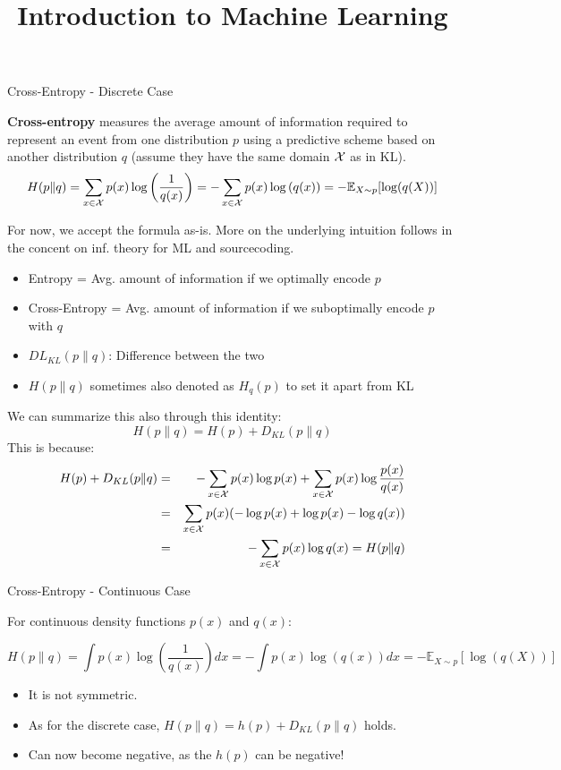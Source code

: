 \documentclass[11pt,compress,t,notes=noshow, xcolor=table]{beamer}
\title{Introduction to Machine Learning}
\date{}
\begin{document}


\begin{vbframe} {Cross-Entropy - Discrete Case}

\textbf{Cross-entropy} measures the average amount of information required to represent an event from one distribution $p$ using a predictive scheme based on another distribution $q$ (assume they have the same domain $\mathcal{X}$ as in KL).
  $$ H(p \| q) = \sum_{x \in \mathcal{X}} p(x) \log\left(\frac{1}{q(x)}\right) = - \sum_{x \in \mathcal{X}} p(x) \log\left(q(x)\right) = - \mathbb{E}_{X\sim p}[\log(q(X))]$$

For now, we accept the formula as-is. More on the underlying intuition follows in the concent on inf. theory for ML and sourcecoding.
\begin{itemize}
\setlength{\itemsep}{0.9em}
\item Entropy = Avg. amount of information if we optimally encode $p$
\item Cross-Entropy = Avg. amount of information if we suboptimally encode $p$ with $q$
\item $DL_ {KL}(p \| q)$: Difference between the two
\item $H(p \| q)$ sometimes also denoted as $H_{q}(p)$ to set it apart from KL
\end{itemize}

\framebreak

We can summarize this also through this identity: 
\lz
$$
H(p \| q) = H(p) + D_{KL}(p \| q)
$$
This is because: 
\begin{eqnarray*}
H(p) + D_{KL}(p \| q) &=& - \sum_{x \in \mathcal{X}} p(x) \log p(x) + \sum_{x \in \mathcal{X}} p(x) \log \frac{p(x)}{q(x)} \\
                      &=& \sum_{x \in \mathcal{X}} p(x) (-\log p(x) +  \log p(x) - \log q(x)) \\
&=& - \sum_{x \in \mathcal{X}} p(x) \log q(x) = H(p \| q) \\
\end{eqnarray*}
   
\framebreak
\end{vbframe}

\begin{vbframe} {Cross-Entropy - Continuous Case}

For continuous density functions $p(x)$ and $q(x)$: 

$$ H(p \| q) = \int p(x) \log\left(\frac{1}{q(x)}\right) dx = - \int p(x) \log\left(q(x)\right) dx = - \mathbb{E}_{X \sim p}[\log(q(X))]$$

\begin{itemize}
\item It is not symmetric.
\item As for the discrete case, $H(p \| q) = h(p) + D_{KL}(p \| q)$ holds.
\item Can now become negative, as the $h(p)$ can be negative! 
\end{itemize}
\end{vbframe}
 
\end{document}
